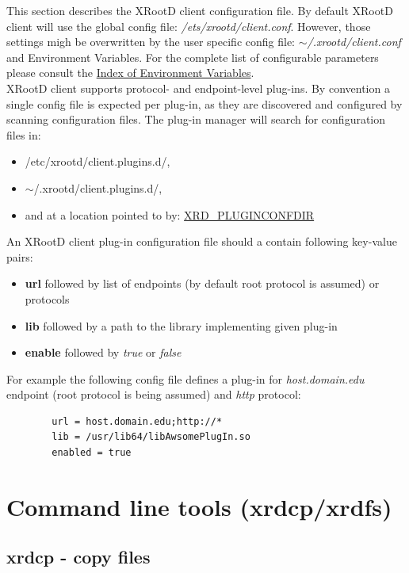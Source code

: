 \documentclass{article}
\begin{document}
	This section describes the XRootD client configuration file. By default XRootD client will use
	the global config file: \textit{/ets/xrootd/client.conf}. However, those settings migh be overwritten
	by the user specific config file: \textit{$\sim$/.xrootd/client.conf} and Environment Variables. For 
	the complete list of configurable parameters please consult the \hyperref[sec:envar]	
	{Index of Environment Variables}. \\
	XRootD client supports protocol- and endpoint-level plug-ins. By convention a single config file is 
	expected per plug-in, as they are discovered and configured by scanning configuration files. The
	plug-in manager will search for configuration files in:
	\begin{itemize}
	  \item /etc/xrootd/client.plugins.d/,
	  \item $\sim$/.xrootd/client.plugins.d/,
	  \item and at a location pointed to by: \hyperref[env:pluginconfigdir]{XRD_PLUGINCONFDIR}
	\end{itemize}
	An XRootD client plug-in configuration file should a contain following key-value pairs:
	\begin{itemize}
	  \item \textbf{url} followed by list of endpoints (by default root protocol is assumed) or protocols
	  \item \textbf{lib} followed by a path to the library implementing given plug-in
	  \item \textbf{enable} followed by \textit{true} or \textit{false} 
	\end{itemize}
	For example the following config file defines a plug-in for \textit{host.domain.edu} endpoint (root 
	protocol is being assumed) and \textit{http} protocol:
	
	\begin{lstlisting}
		url = host.domain.edu;http://*
		lib = /usr/lib64/libAwsomePlugIn.so
		enabled = true
	\end{lstlisting}


\section{Command line tools (xrdcp/xrdfs)}

    \subsection{xrdcp - copy files}
    
\end{document}
